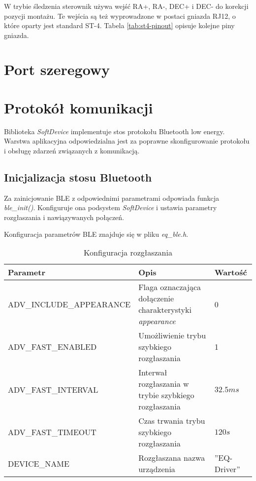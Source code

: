 W trybie śledzenia sterownik używa wejść RA+, RA-, DEC+ i DEC- do korekcji
pozycji montażu. Te wejścia są też wyprowadzone w postaci gniazda RJ12, o które
oparty jest standard ST-4. Tabela \ref{tab:st4-pinout} opisuje kolejne piny
gniazda.

\section{Port szeregowy}


\section{Protokół komunikacji}

Biblioteka \emph{SoftDevice} implementuje stos protokołu Bluetooth low energy.
Warstwa aplikacyjna odpowiedzialna jest za poprawne skonfigurowanie protokołu
i obsługę zdarzeń związanych z komunikacją.

\subsection{Inicjalizacja stosu Bluetooth}

Za zainicjowanie BLE z odpowiednimi parametrami odpowiada funkcja
\emph{ble\_init()}. Konfiguruje ona podsystem \emph{SoftDevice} i ustawia
parametry rozgłaszania i nawiązywanych połączeń.

Konfiguracja parametrów BLE znajduje się w pliku \emph{eq\_ble.h}.

\begin{table}[t]

\begin{tabularx}{\linewidth}{|l|X|l|}

\hline Parametr & Opis & Wartość \\

\hline ADV\_INCLUDE\_APPEARANCE & Flaga oznaczająca dołączenie charakterystyki
\emph{appearance} & 0 \\

\hline ADV\_FAST\_ENABLED & Umożliwienie trybu szybkiego rozgłaszania & 1 \\

\hline ADV\_FAST\_INTERVAL & Interwał rozgłaszania w trybie szybkiego
rozgłaszania & $32.5ms$ \\

\hline ADV\_FAST\_TIMEOUT & Czas trwania trybu szybkiego rozgłaszania & $120s$
\\

\hline DEVICE\_NAME & Rozgłaszana nazwa urządzenia & ''EQ-Driver'' \\

\hline \end{tabularx}

\caption{Konfiguracja rozgłaszania}

\label{tab:parametry-rozglaszania}

\end{table}

